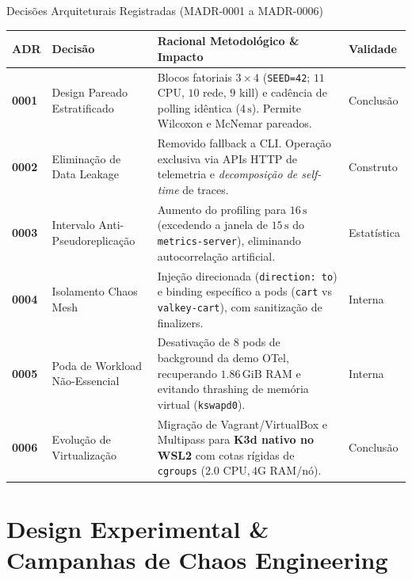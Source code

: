 \documentclass[aspectratio=169, 10pt]{beamer}
\begin{document}
\begin{frame}{Decisões Arquiteturais Registradas (MADR-0001 a MADR-0006)}
  \small
  \begin{tabularx}{\textwidth}{l p{3.2cm} X l}
    \toprule
    \textbf{ADR} & \textbf{Decisão} & \textbf{Racional Metodológico \& Impacto} & \textbf{Validade} \\
    \midrule
    \textbf{0001} & Design Pareado Estratificado & Blocos fatoriais $3\times4$ (\texttt{SEED=42}; $11$ CPU, $10$ rede, $9$ kill) e cadência de polling idêntica ($4\,\text{s}$). Permite Wilcoxon e McNemar pareados. & Conclusão \\
    \addlinespace
    \textbf{0002} & Eliminação de Data Leakage & Removido fallback a CLI. Operação exclusiva via APIs HTTP de telemetria e \textit{decomposição de self-time} de traces. & Construto \\
    \addlinespace
    \textbf{0003} & Intervalo Anti-Pseudoreplicação & Aumento do profiling para $16\,\text{s}$ (excedendo a janela de $15\,\text{s}$ do \texttt{metrics-server}), eliminando autocorrelação artificial. & Estatística \\
    \addlinespace
    \textbf{0004} & Isolamento Chaos Mesh & Injeção direcionada (\texttt{direction: to}) e binding específico a pods (\texttt{cart} vs \texttt{valkey-cart}), com sanitização de finalizers. & Interna \\
    \addlinespace
    \textbf{0005} & Poda de Workload Não-Essencial & Desativação de 8 pods de background da demo OTel, recuperando $1.86\,\text{GiB}$ RAM e evitando thrashing de memória virtual (\texttt{kswapd0}). & Interna \\
    \addlinespace
    \textbf{0006} & Evolução de Virtualização & Migração de Vagrant/VirtualBox e Multipass para \textbf{K3d nativo no WSL2} com cotas rígidas de \texttt{cgroups} ($2.0\text{ CPU}, 4\text{G RAM}$/nó). & Conclusão \\
    \bottomrule
  \end{tabularx}
\end{frame}

\section{Design Experimental \& Campanhas de Chaos Engineering}
\end{document}
